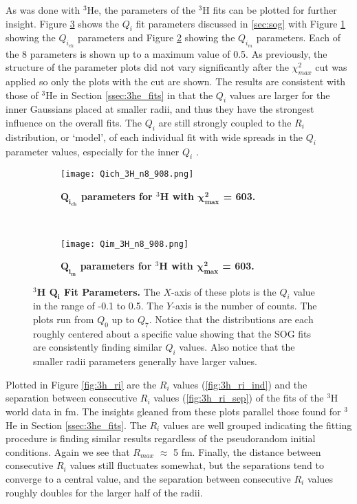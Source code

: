 As was done with $^3$He, the parameters of the $^3$H fits can be plotted for further insight. Figure \ref{fig:3h_qi} shows the $Q_i$ fit parameters discussed in \ref{sec:sog} with Figure \ref{fig:3h_qch} showing the $Q_{i_{ch}}$ parameters and Figure \ref{fig:3h_qm} showing the $Q_{i_{m}}$ parameters. Each of the 8 parameters is shown up to a maximum value of 0.5. As previously, the structure of the parameter plots did not vary significantly after the $\chi^2_{max}$ cut was applied so only the plots with the cut are shown. The results are consistent with those of $^3$He in Section \ref{ssec:3he_fits} in that the $Q_i$ values are larger for the inner Gaussians placed at smaller radii, and thus they have the strongest influence on the overall fits. The $Q_i$ are still strongly coupled to the $R_i$ distribution, or `model', of each individual fit with wide spreads in the $Q_i$ parameter values, especially for the inner $Q_i$ .

\begin{figure}[!ht]
\begin{subfigure}{1.\textwidth}
  \centering
  \texttt{[image: Qich\_3H\_n8\_908.png]}
  \caption{\bf{$\boldsymbol{Q_{i_{ch}}}$ parameters for $^3$H with $\boldsymbol{\chi^2_{max}}$ = 603.}}
  \label{fig:3h_qch}
\end{subfigure}\\
\begin{subfigure}{1.\textwidth}
  \centering
  \texttt{[image: Qim\_3H\_n8\_908.png]}
  \caption{\bf{$\boldsymbol{Q_{i_{m}}}$ parameters for $^3$H with $\boldsymbol{\chi^2_{max}}$ = 603.}}
  \label{fig:3h_qm}
\end{subfigure}
\caption[$^3$H $Q_i$ Fit Parameters]{{\bf{$^3$H $\boldsymbol{Q_i}$ Fit Parameters.}} The $X$-axis of these plots is the $Q_i$ value in the range of -0.1 to 0.5. The $Y$-axis is the number of counts. The plots run from $Q_0$ up to $Q_7$. Notice that the distributions are each roughly centered about a specific value showing that the SOG fits are consistently finding similar $Q_i$ values. Also notice that the smaller radii parameters generally have larger values.}
\label{fig:3h_qi}
\end{figure}

Plotted in Figure \ref{fig:3h_ri} are the $R_i$ values (\ref{fig:3h_ri_ind}) and the separation between consecutive $R_i$ values (\ref{fig:3h_ri_sep}) of the fits of the $^3$H world data in fm. The insights gleaned from these plots parallel those found for $^3$He in Section \ref{ssec:3he_fits}. The $R_i$ values are well grouped indicating the fitting procedure is finding similar results regardless of the pseudorandom initial conditions. Again we see that  $R_{max}$ $\approx$ 5 fm. Finally, the distance between consecutive $R_i$ values still fluctuates somewhat, but the separations tend to converge to a central value, and the separation between consecutive $R_i$ values roughly doubles for the larger half of the radii.

